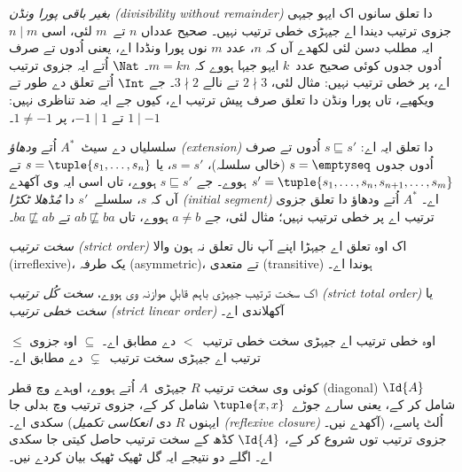 \documentclass[../../../include/open-logic-section]{subfiles}
\begin{document}
\begin{ex}
\emph{بغیر باقی پورا ونڈن (divisibility without remainder)} دا تعلق سانوں اک ایہو جیہی جزوی ترتیب
دیندا اے جیہڑی خطی ترتیب نہیں۔ صحیح عدداں $n$ تے~$m$ لئی، اسی
$n \mid m$ ایہ مطلب دسن لئی لکھدے آں کہ $n$، عدد $m$ نوں پورا ونڈدا
اے، یعنی اُدوں تے صرف اُدوں جدوں کوئی صحیح عدد~$k$ ایہو جیہا ہووے کہ
$m = kn$۔ $\Nat$ اُتے ایہ جزوی ترتیب اے، پر خطی ترتیب نہیں: مثال لئی،
$2 \nmid 3$ تے نالے $3 \nmid 2$۔ جے $\Int$ اُتے تعلق دے طور تے ویکھیے،
تاں پورا ونڈن دا تعلق صرف پیش ترتیب اے، کیوں جے ایہ ضد تناظری نہیں:
$1 \mid -1$ تے $-1 \mid 1$، پر $1 \neq -1$۔
\end{ex}

\begin{ex}
سلسلیاں دے سیٹ~$A^*$ اُتے \emph{ودھاؤ (extension)} دا تعلق ایہ اے: $s \sqsubseteq s'$
اُدوں تے صرف اُدوں جدوں $s = \emptyseq$ (خالی سلسلہ)، $s = s'$، یا
$s = \tuple{s_1, \dots, s_n}$ تے $s' =
\tuple{s_1, \dots, s_n, s_{n+1}, \dots, s_m}$ ہووے۔ جے $s \sqsubseteq s'$
ہووے، تاں اسی ایہ وی آکھدے آں کہ $s$، سلسلے~$s'$ دا \emph{مُڈھلا ٹکڑا
(initial segment)}
اے۔ $A^*$ اُتے ودھاؤ دا تعلق جزوی ترتیب اے پر خطی ترتیب نہیں؛ مثال لئی،
جے $a \neq b$ ہووے، تاں $ab \not\sqsubseteq ba$ تے $ba \not\sqsubseteq ab$۔
\end{ex}

\begin{defn}
\emph{سخت ترتیب (strict order)} اک اوہ تعلق اے جیہڑا اپنے آپ نال تعلق
نہ ہون والا (irreflexive)، یک طرفہ (asymmetric)، تے متعدی (transitive) ہوندا اے۔
\end{defn}

\begin{defn}
اک سخت ترتیب جیہڑی باہم قابلِ موازنہ وی ہووے، \emph{سخت کُل ترتیب
(strict total order)} یا \emph{سخت خطی ترتیب (strict linear order)} آکھلاندی اے۔
\end{defn}

\begin{ex}
$\le$ اوہ خطی ترتیب اے جیہڑی سخت خطی ترتیب~$<$ دے مطابق اے۔
$\subseteq$ اوہ جزوی ترتیب اے جیہڑی سخت ترتیب~$\subsetneq$ دے مطابق اے۔
\end{ex}

کوئی وی سخت ترتیب $R$ جیہڑی~$A$ اُتے ہووے، اوہدے وچ قطر (diagonal) $\Id{A}$ شامل
کر کے، یعنی سارے جوڑے~$\tuple{x, x}$ شامل کر کے، جزوی ترتیب وچ بدلی
جا سکدی اے۔ (ایہنوں $R$ دی \emph{انعکاسی تکمیل (reflexive closure)} آکھدے نیں۔) اُلٹ پاسے،
جزوی ترتیب توں شروع کر کے، $\Id{A}$ کڈھ کے سخت ترتیب حاصل کیتی جا
سکدی اے۔ اگلے دو نتیجے ایہ گل ٹھیک ٹھیک بیان کردے نیں۔
\end{document}
